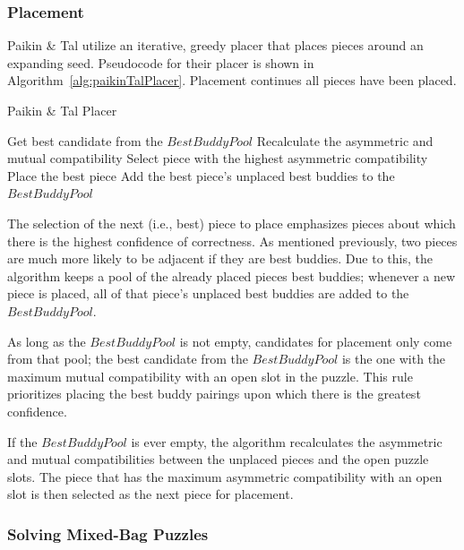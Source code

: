 \documentclass{report}
\begin{document}
\subsubsection{Placement}\label{sec:paikinTalPlacer}

Paikin \& Tal utilize an iterative, greedy placer that places pieces around an expanding seed.  Pseudocode for their placer is shown in Algorithm~\ref{alg:paikinTalPlacer}.  Placement continues all pieces have been placed.

\begin{algorithm}
\caption{Paikin \& Tal Placer}\label{alg:paikinTalPlacer}
\begin{algorithmic}[1]

      \State Get best candidate from the $BestBuddyPool$
   \Else
      \State Recalculate the asymmetric and mutual compatibility
      \State Select piece with the highest asymmetric compatibility
   \EndIf  
   \State Place the best piece
   \State Add the best piece's unplaced best buddies to the $BestBuddyPool$

\EndWhile
\end{algorithmic}
\end{algorithm}

The selection of the next (i.e., best) piece to place emphasizes pieces about which there is the highest confidence of correctness. As mentioned previously, two pieces are much more likely to be adjacent if they are best buddies.  Due to this, the algorithm keeps a pool of the already placed pieces best buddies; whenever a new piece is placed, all of that piece's unplaced best buddies are added to the $BestBuddyPool$.  

As long as the $BestBuddyPool$ is not empty, candidates for placement only come from that pool; the best candidate from the $BestBuddyPool$ is the one with the maximum mutual compatibility with an open slot in the puzzle.  This rule prioritizes placing the best buddy pairings upon which there is the greatest confidence.

If the $BestBuddyPool$ is ever empty, the algorithm recalculates the asymmetric and mutual compatibilities between the unplaced pieces and the open puzzle slots.  The piece that has the maximum asymmetric compatibility with an open slot is then selected as the next piece for placement.

\subsubsection{Solving Mixed-Bag Puzzles}\label{sec:paikinTalSolvingMultiplePuzzles}
\end{document}
